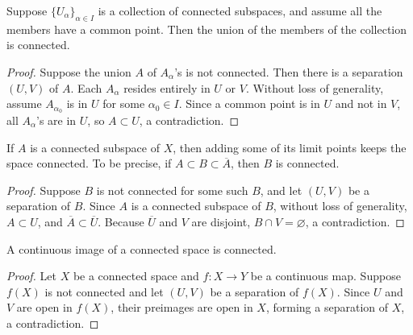 \begin{prop}\label{nonempty intersection keeps connectedness}
    Suppose $\{U_\alpha\}_{\alpha\in I}$ is a collection of connected subspaces, and assume all the members have a common point.
    Then the union of the members of the collection is connected.
\end{prop}
\begin{proof}
    Suppose the union $A$ of $A_\alpha$'s is not connected.
    Then there is a separation $(U, V)$ of $A$.
    Each $A_\alpha$ resides entirely in $U$ or $V$.
    Without loss of generality, assume $A_{\alpha_0}$ is in $U$ for some $\alpha_0\in I$.
    Since a common point is in $U$ and not in $V$, all $A_\alpha$'s are in $U$, so $A\subset U$, a contradiction.
\end{proof}

\begin{prop}\label{adding limit points keeps connectedness}
    If $A$ is a connected subspace of $X$, then adding some of its limit points keeps the space connected.
    To be precise, if $A\subset B\subset\overline{A}$, then $B$ is connected.
\end{prop}
\begin{proof}
    Suppose $B$ is not connected for some such $B$, and let $(U, V)$ be a separation of $B$.
    Since $A$ is a connected subspace of $B$, without loss of generality, $A\subset U$, and $\overline{A}\subset \overline{U}$.
    Because $\overline{U}$ and $V$ are disjoint, $B\cap V=\varnothing$, a contradiction.
\end{proof}

\begin{prop}\label{continuity keeps connectedness}
    A continuous image of a connected space is connected.
\end{prop}
\begin{proof}
    Let $X$ be a connected space and $f: X\rightarrow Y$ be a continuous map.
    Suppose $f(X)$ is not connected and let $(U, V)$ be a separation of $f(X)$.
    Since $U$ and $V$ are open in $f(X)$, their preimages are open in $X$, forming a separation of $X$, a contradiction.
\end{proof}

